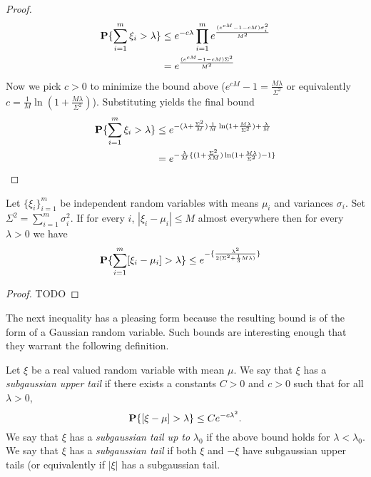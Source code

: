 \begin{proof}
\begin{align*}
\textbf{P}\{\sum_{i=1}^m \xi_i > \lambda\} &\leq e^{-c\lambda} \prod_{i=1}^m
e^{\frac{(e^{cM} -1 - cM)\sigma_i^2}{M^2}} \\
& = e^{\frac{(e^{cM} -1 - cM)\Sigma^2}{M^2}}
\end{align*}
Now we pick $c>0$ to minimize the bound above ($e^{cM} -1 =
\frac{M\lambda}{\Sigma^2}$ or equivalently $c = \frac{1}{M}\ln(1 + \frac{M\lambda}{\Sigma^2})$).
Substituting yields the final bound
\begin{align*}
\textbf{P}\{\sum_{i=1}^m \xi_i > \lambda\} &\leq e^{-(\lambda + \frac{\Sigma^2}{M})
  \frac{1}{M}\ln(1 + \frac{M\lambda}{\Sigma^2}) + \frac{\lambda}{M}}
\\
& = e^{-\frac{\lambda}{M} \{
  (1+\frac{\Sigma^2}{\lambda M}) \ln(1 + \frac{M\lambda}{\Sigma^2}) -1
\}}
\end{align*}
\end{proof}

\begin{lem}\label{Bernstein} Let
  $\{\xi_i\}_{i=1}^m$ be independent random variables with means
  $\mu_i$ and variances $\sigma_i$.  Set $\Sigma^2 = \sum_{i=1}^m
  \sigma_i^2$.  If for every $i$, $|\xi_i - \mu_i| \leq M$ almost
  everywhere then for every $\lambda > 0$ we have 
\begin{align*}
\textbf{P}\{\sum_{i=1}^m [\xi_i - \mu_i] > \lambda\} &\leq 
e^{
	-\{\frac{\lambda^2}{2(\Sigma^2 + \frac{1}{3}M\lambda)}\}
}
\end{align*}
\end{lem}
\begin{proof}
TODO
\end{proof}

The next inequality has a pleasing form because the resulting bound is
of the form of a Gaussian random variable.  Such bounds are
interesting enough that they warrant the following definition.
\begin{defn} Let $\xi$ be a real valued random variable with mean
  $\mu$.  We say that $\xi$ has a \emph{subgaussian upper tail} if there
  exists a  constants $C > 0$ and $c > 0$ such that for all $\lambda > 0$,
$$
\textbf{P}\{[\xi-\mu] > \lambda\} \leq Ce^{-c\lambda^2}.
$$
We say that $\xi$ has a \emph{subgaussian tail up to} $\lambda_0$ if the
above bound holds for $\lambda < \lambda_0$.  We say that $\xi$ has a
\emph{subgaussian tail} if both $\xi$ and $-\xi$ have subgaussian upper
tails (or equivalently if $|\xi|$ has a subgaussian tail.
\end{defn}

